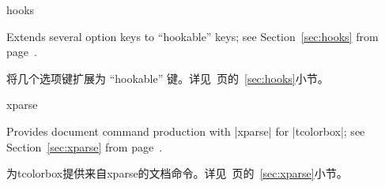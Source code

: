 









\begin{docTcbKey}[library]{hooks}{}{}

Extends several option keys to \enquote{hookable} keys;
see Section~\ref{sec:hooks} from page~\pageref{sec:hooks}.

将几个选项键扩展为 \enquote{hookable} 键。详见~\pageref{sec:hooks}页的~\ref{sec:hooks}小节。

\end{docTcbKey}






\begin{docTcbKey}[library]{xparse}{}{}

Provides document command production with |xparse| for |tcolorbox|;
see Section~\ref{sec:xparse} from page~\pageref{sec:xparse}.

为tcolorbox提供来自xparse的文档命令。详见~\pageref{sec:xparse}页的~\ref{sec:xparse}小节。

\end{docTcbKey}

